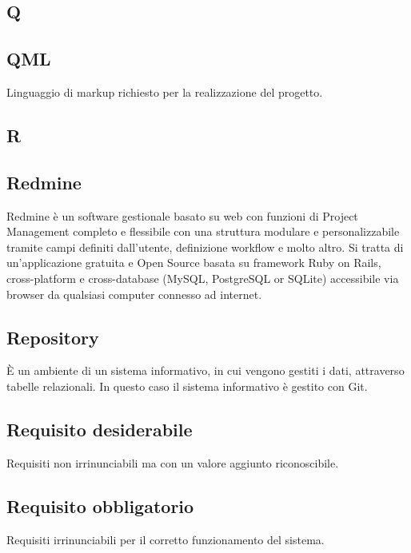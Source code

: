 \newpage

\begin{center}
\Huge\section{\uppercase{Q}}
\end{center}

\subsection{QML}
Linguaggio di markup richiesto per la realizzazione del progetto.

\newpage

\begin{center}
\Huge\section{\uppercase{R}}
\end{center}

\subsection{Redmine}
Redmine è un software gestionale basato su web con funzioni di Project Management completo e flessibile con una struttura modulare e personalizzabile tramite campi definiti dall'utente, definizione workflow e molto altro.
Si tratta di un'applicazione gratuita e Open Source basata su framework Ruby on Rails, cross-platform e cross-database (MySQL, PostgreSQL or SQLite) accessibile via browser da qualsiasi computer connesso ad internet.

\subsection{Repository}
È un ambiente di un sistema informativo, in cui vengono gestiti i dati, attraverso
tabelle relazionali. In questo caso il sistema informativo è gestito con Git.

\subsection{Requisito desiderabile}
Requisiti non irrinunciabili ma con un valore aggiunto riconoscibile.

\subsection{Requisito obbligatorio}
Requisiti irrinunciabili per il corretto funzionamento del sistema.

